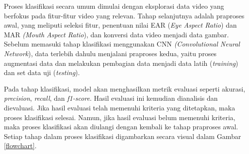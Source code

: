     Proses klasifikasi secara umum dimulai dengan eksplorasi data video yang berfokus pada fitur-fitur video yang relevan. Tahap selanjutnya adalah praproses awal, yang meliputi seleksi fitur, penentuan nilai EAR (\textit{Eye Aspect Ratio}) dan MAR \textit{(Mouth Aspect Ratio}), dan konversi data video menjadi data gambar. Sebelum memasuki tahap klasifikasi menggunakan CNN \textit{(Convolutional Neural Network}), data terlebih dahulu menjalani praproses kedua, yaitu proses augmentasi data dan melakukan pembagian data menjadi data latih (\textit{training}) dan set data uji (\textit{testing}).

    Pada tahap klasifikasi, model akan menghasilkan metrik evaluasi seperti akurasi,\textit{ precision}, \textit{recall}, dan \textit{f1-score}. Hasil evaluasi ini kemudian dianalisis dan dievaluasi. Jika hasil evaluasi telah memenuhi kriteria yang ditetapkan, maka proses klasifikasi selesai. Namun, jika hasil evaluasi belum memenuhi kriteria, maka proses klasifikasi akan diulangi dengan kembali ke tahap praproses awal. Setiap tahap dalam proses klasifikasi digambarkan secara visual dalam Gambar \ref{flowchart}.


